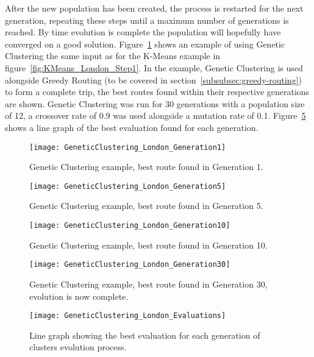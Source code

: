 \noindent
After the new population has been created, the process is restarted for the next generation, repeating these steps
until a maximum number of generations is reached.
By time evolution is complete the population will hopefully have converged on a good solution.
Figure~\ref{fig:GeneticClustering_London_Generation1} shows an example of using Genetic Clustering the same input as
for the K-Means example in figure~\ref{fig:KMeans_London_Step1}.
In the example, Genetic Clustering is used alongside Greedy Routing (to be covered in section~\ref{subsubsec:greedy-routing})
to form a complete trip, the best routes found within their respective generations are shown.
Genetic Clustering was run for 30 generations with a population size of 12, a crossover rate of 0.9 was used
alongside a mutation rate of 0.1.
Figure~\ref{fig:GeneticClustering_London_Evaluations} shows a line graph of the best evaluation found for each
generation.
\begin{figure}[H]
    \ContinuedFloat*
    \centering
    \texttt{[image: GeneticClustering\_London\_Generation1]}
    \caption{Genetic Clustering example, best route found in Generation 1.}
    \label{fig:GeneticClustering_London_Generation1}
\end{figure}
\begin{figure}[H]
    \ContinuedFloat
    \centering
    \texttt{[image: GeneticClustering\_London\_Generation5]}
    \caption{Genetic Clustering example, best route found in Generation 5.}
    \label{fig:GeneticClustering_London_Generation2}
\end{figure}
\begin{figure}[H]
    \ContinuedFloat
    \centering
    \texttt{[image: GeneticClustering\_London\_Generation10]}
    \caption{Genetic Clustering example, best route found in Generation 10.}
    \label{fig:GeneticClustering_London_Generation10}
\end{figure}
\begin{figure}[H]
    \ContinuedFloat
    \centering
    \texttt{[image: GeneticClustering\_London\_Generation30]}
    \caption{Genetic Clustering example, best route found in Generation 30, evolution is now complete.}
    \label{fig:GeneticClustering_London_Generation30}
\end{figure}
\begin{figure}[H]
    \centering
    \texttt{[image: GeneticClustering\_London\_Evaluations]}
    \caption{Line graph showing the best evaluation for each generation of clusters evolution process.}
    \label{fig:GeneticClustering_London_Evaluations}
\end{figure}

